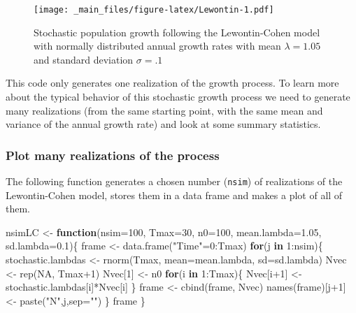 \documentclass[
]{book}
\newenvironment{Shaded}{\begin{snugshade}}{\end{snugshade}}
\newcommand{\AttributeTok}[1]{\textcolor[rgb]{0.77,0.63,0.00}{#1}}
\newcommand{\ConstantTok}[1]{\textcolor[rgb]{0.00,0.00,0.00}{#1}}
\newcommand{\ControlFlowTok}[1]{\textcolor[rgb]{0.13,0.29,0.53}{\textbf{#1}}}
\newcommand{\DecValTok}[1]{\textcolor[rgb]{0.00,0.00,0.81}{#1}}
\newcommand{\FloatTok}[1]{\textcolor[rgb]{0.00,0.00,0.81}{#1}}
\newcommand{\FunctionTok}[1]{\textcolor[rgb]{0.00,0.00,0.00}{#1}}
\newcommand{\NormalTok}[1]{#1}
\newcommand{\OtherTok}[1]{\textcolor[rgb]{0.56,0.35,0.01}{#1}}
\newcommand{\SpecialCharTok}[1]{\textcolor[rgb]{0.00,0.00,0.00}{#1}}
\newcommand{\StringTok}[1]{\textcolor[rgb]{0.31,0.60,0.02}{#1}}
\begin{document}
\begin{figure}
\centering
\texttt{[image: \_main\_files/figure-latex/Lewontin-1.pdf]}
\caption{\label{fig:Lewontin}Stochastic population growth following the Lewontin-Cohen model with normally distributed annual growth rates with mean \(\lambda=1.05\) and standard deviation \(\sigma=.1\)}
\end{figure}

This code only generates one realization of the growth process. To learn more about the typical behavior of this stochastic growth process we need to generate many realizations (from the same starting point, with the same mean and variance of the annual growth rate) and look at some summary statistics.

\hypertarget{plot-many-realizations-of-the-process}{%
\subsubsection*{Plot many realizations of the process}\label{plot-many-realizations-of-the-process}}

The following function generates a chosen number (\texttt{nsim}) of realizations of the Lewontin-Cohen model, stores them in a data frame and makes a plot of all of them.

\begin{Shaded}
\begin{Highlighting}[]
\NormalTok{nsimLC }\OtherTok{\textless{}{-}} \ControlFlowTok{function}\NormalTok{(}\AttributeTok{nsim=}\DecValTok{100}\NormalTok{, }\AttributeTok{Tmax=}\DecValTok{30}\NormalTok{, }\AttributeTok{n0=}\DecValTok{100}\NormalTok{, }
                   \AttributeTok{mean.lambda=}\FloatTok{1.05}\NormalTok{, }\AttributeTok{sd.lambda=}\FloatTok{0.1}\NormalTok{)\{}
\NormalTok{  frame }\OtherTok{\textless{}{-}}  \FunctionTok{data.frame}\NormalTok{(}\StringTok{"Time"}\OtherTok{=}\DecValTok{0}\SpecialCharTok{:}\NormalTok{Tmax)}
  \ControlFlowTok{for}\NormalTok{(j }\ControlFlowTok{in} \DecValTok{1}\SpecialCharTok{:}\NormalTok{nsim)\{}
\NormalTok{  stochastic.lambdas }\OtherTok{\textless{}{-}} \FunctionTok{rnorm}\NormalTok{(Tmax, }\AttributeTok{mean=}\NormalTok{mean.lambda, }\AttributeTok{sd=}\NormalTok{sd.lambda)}
\NormalTok{  Nvec }\OtherTok{\textless{}{-}} \FunctionTok{rep}\NormalTok{(}\ConstantTok{NA}\NormalTok{, Tmax}\SpecialCharTok{+}\DecValTok{1}\NormalTok{)}
\NormalTok{  Nvec[}\DecValTok{1}\NormalTok{] }\OtherTok{\textless{}{-}}\NormalTok{ n0}
  \ControlFlowTok{for}\NormalTok{(i }\ControlFlowTok{in} \DecValTok{1}\SpecialCharTok{:}\NormalTok{Tmax)\{}
\NormalTok{    Nvec[i}\SpecialCharTok{+}\DecValTok{1}\NormalTok{] }\OtherTok{\textless{}{-}}\NormalTok{ stochastic.lambdas[i]}\SpecialCharTok{*}\NormalTok{Nvec[i]}
\NormalTok{  \}}
\NormalTok{  frame }\OtherTok{\textless{}{-}} \FunctionTok{cbind}\NormalTok{(frame, Nvec)}
  \FunctionTok{names}\NormalTok{(frame)[j}\SpecialCharTok{+}\DecValTok{1}\NormalTok{] }\OtherTok{\textless{}{-}} \FunctionTok{paste}\NormalTok{(}\StringTok{"N"}\NormalTok{,j,}\AttributeTok{sep=}\StringTok{""}\NormalTok{)}
\NormalTok{  \}}
\NormalTok{  frame}
\NormalTok{\}}
\end{Highlighting}
\end{Shaded}
\end{document}
